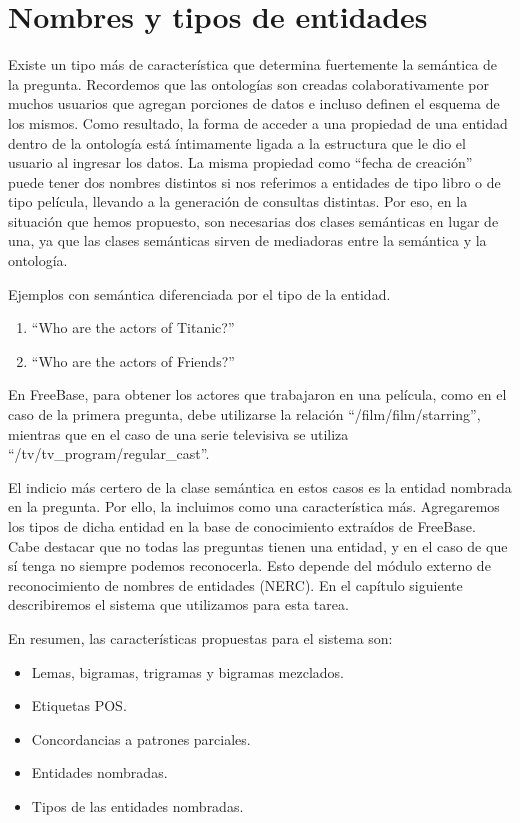 \section{Nombres y tipos de entidades}

Existe un tipo más de característica que determina fuertemente la semántica de la pregunta. Recordemos que las ontologías son creadas colaborativamente por muchos usuarios que agregan porciones de datos e incluso definen el esquema de los mismos. Como resultado, la forma de acceder a una propiedad de una entidad dentro de la ontología está íntimamente ligada a la estructura que le dio el usuario al ingresar los datos. La misma propiedad como ``fecha de creación'' puede tener dos nombres distintos si nos referimos a entidades de tipo libro o de tipo película, llevando a la generación de consultas distintas. Por eso, en la situación que hemos propuesto, son necesarias dos clases semánticas en lugar de una, ya que las clases semánticas sirven de mediadoras entre la semántica y la ontología.

\begin{example} Ejemplos con semántica diferenciada por el tipo de la entidad.
    \begin{enumerate}
        \item ``Who are the actors of Titanic?''
        \item ``Who are the actors of Friends?''
    \end{enumerate}
En FreeBase, para obtener los actores que trabajaron en una película, como en el caso de la primera pregunta, debe utilizarse la relación ``/film/film/starring'', mientras que en el caso de una serie televisiva se utiliza ``/tv/tv\_program/regular\_cast''.
\end{example}

El indicio más certero de la clase semántica en estos casos es la entidad nombrada en la pregunta. Por ello, la incluimos como una característica más. Agregaremos los tipos de dicha entidad en la base de conocimiento extraídos de FreeBase. Cabe destacar que no todas las preguntas tienen una entidad, y en el caso de que sí tenga no siempre podemos reconocerla. Esto depende del módulo externo de reconocimiento de nombres de entidades (NERC). En el capítulo siguiente describiremos el sistema que utilizamos para esta tarea.

En resumen, las características propuestas para el sistema son:
\begin{itemize}
    \item Lemas, bigramas, trigramas y bigramas mezclados.
    \item Etiquetas POS.
    \item Concordancias a patrones parciales.
    \item Entidades nombradas.
    \item Tipos de las entidades nombradas.
\end{itemize}

